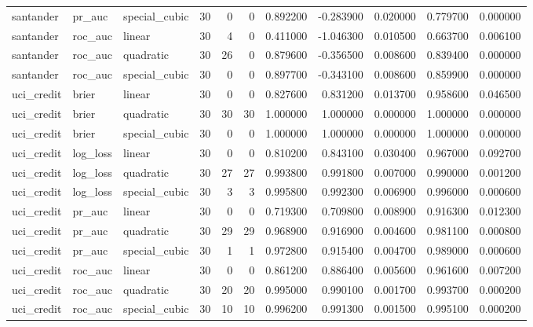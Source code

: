 \begin{longtable}{lllrrrrrrrr}
santander & pr\_auc & special\_cubic & 30 & 0 & 0 & 0.892200 & -0.283900 & 0.020000 & 0.779700 & 0.000000 \\
santander & roc\_auc & linear & 30 & 4 & 0 & 0.411000 & -1.046300 & 0.010500 & 0.663700 & 0.006100 \\
santander & roc\_auc & quadratic & 30 & 26 & 0 & 0.879600 & -0.356500 & 0.008600 & 0.839400 & 0.000000 \\
santander & roc\_auc & special\_cubic & 30 & 0 & 0 & 0.897700 & -0.343100 & 0.008600 & 0.859900 & 0.000000 \\
uci\_credit & brier & linear & 30 & 0 & 0 & 0.827600 & 0.831200 & 0.013700 & 0.958600 & 0.046500 \\
uci\_credit & brier & quadratic & 30 & 30 & 30 & 1.000000 & 1.000000 & 0.000000 & 1.000000 & 0.000000 \\
uci\_credit & brier & special\_cubic & 30 & 0 & 0 & 1.000000 & 1.000000 & 0.000000 & 1.000000 & 0.000000 \\
uci\_credit & log\_loss & linear & 30 & 0 & 0 & 0.810200 & 0.843100 & 0.030400 & 0.967000 & 0.092700 \\
uci\_credit & log\_loss & quadratic & 30 & 27 & 27 & 0.993800 & 0.991800 & 0.007000 & 0.990000 & 0.001200 \\
uci\_credit & log\_loss & special\_cubic & 30 & 3 & 3 & 0.995800 & 0.992300 & 0.006900 & 0.996000 & 0.000600 \\
uci\_credit & pr\_auc & linear & 30 & 0 & 0 & 0.719300 & 0.709800 & 0.008900 & 0.916300 & 0.012300 \\
uci\_credit & pr\_auc & quadratic & 30 & 29 & 29 & 0.968900 & 0.916900 & 0.004600 & 0.981100 & 0.000800 \\
uci\_credit & pr\_auc & special\_cubic & 30 & 1 & 1 & 0.972800 & 0.915400 & 0.004700 & 0.989000 & 0.000600 \\
uci\_credit & roc\_auc & linear & 30 & 0 & 0 & 0.861200 & 0.886400 & 0.005600 & 0.961600 & 0.007200 \\
uci\_credit & roc\_auc & quadratic & 30 & 20 & 20 & 0.995000 & 0.990100 & 0.001700 & 0.993700 & 0.000200 \\
uci\_credit & roc\_auc & special\_cubic & 30 & 10 & 10 & 0.996200 & 0.991300 & 0.001500 & 0.995100 & 0.000200 \\
\end{longtable}\endgroup\addtocounter{table}{-1}
